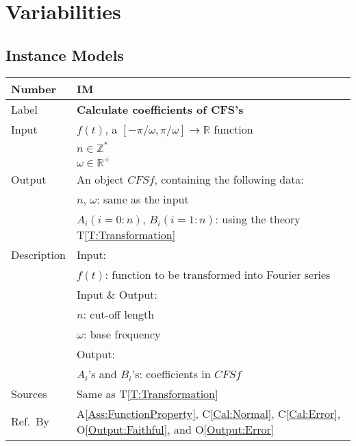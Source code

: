 \documentclass[12pt]{article}
\newcommand{\colAwidth}{0.13\textwidth}
\newcommand{\colBwidth}{0.82\textwidth}
\newcommand{\tref}[1]{T\ref{#1}}
\newcommand{\aref}[1]{A\ref{#1}}
\newcommand{\calref}[1]{C\ref{#1}}
\newcommand{\oref}[1]{O\ref{#1}}
\newcounter{instnum} %
\begin{document}
\section{Variabilities}\label{Sc:Var}
\subsection{Instance Models}
\noindent
\begin{minipage}{\textwidth}
	\renewcommand*{\arraystretch}{1.5}
	\begin{tabular}{| p{\colAwidth} | p{\colBwidth}|}
		\hline
		\rowcolor[gray]{0.9}
		Number& IM{instnum}\theinstnum 
		\label{IM:CFScoeff}\\
		\hline
		Label& \bf Calculate coefficients of CFS's\\
		\hline
		Input& $f(t)$, a $[-\pi/\omega, \pi/\omega]
		\rightarrow\mathbb{R}$ function\\
			& $n\in\mathbb{Z}^{*}$\\
			& $\omega\in\mathbb{R}^{+}$\\
		\hline
		Output& An object $\mathit{CFSf}$, containing the 
		following data:\\
		&$n$, $\omega$: same as the input\\
		&$A_i (i=0:n)$, $B_i (i=1:n)$: using the theory 
		\tref{T:Transformation}\\
		\hline
		Description&Input:\\
		&$f(t)$: function to be transformed into 
		Fourier series\\
		&Input \& Output:\\
		& $n$: cut-off length\\
		& $\omega$: base frequency\\
		&Output:\\
		&$A_i$'s and $B_i$'s: coefficients in $\mathit{CFSf}$\\
		\hline
		Sources&Same as \tref{T:Transformation}		\\
		\hline
		Ref.\ By & \aref{Ass:FunctionProperty}, 
		\calref{Cal:Normal}, \calref{Cal:Error}, 
		\oref{Output:Faithful}, and \oref{Output:Error}\\
		\hline
	\end{tabular}
\end{minipage}\\
~\newline
\noindent
\end{document}
